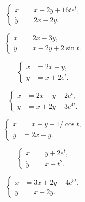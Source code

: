 \begin{multicols}{2}
	\begin{problem}
		\[ \left\{ \begin{aligned}
			\dot x &= x + 2 y + 16 t e^t, \\
			\dot y &= 2 x - 2 y.
		\end{aligned} \right. \]
	\end{problem}

	\begin{problem}
		\[ \left\{ \begin{aligned}
			\dot x &= 2 x - 3 y, \\
			\dot y &= x - 2 y + 2 \sin t.
		\end{aligned} \right. \]
	\end{problem}

	\begin{problem}
		\[ \left\{ \begin{aligned}
			\dot x &= 2 x - y, \\
			\dot y &= x + 2 e^t.
		\end{aligned} \right. \]
	\end{problem}

	\begin{problem}
		\[ \left\{ \begin{aligned}
			\dot x &= 2 x + y + 2 e^t, \\
			\dot y &= x + 2 y - 3 e^{4 t}.
		\end{aligned} \right. \]
	\end{problem}
	
	\begin{problem}
		\[ \left\{ \begin{aligned}
			\dot x &= x - y + 1 / \cos t, \\
			\dot y &= 2 x - y.
		\end{aligned} \right. \]
	\end{problem}
	
	\begin{problem}
		\[ \left\{ \begin{aligned}
			\dot x &= y + 2 e^t, \\
			\dot y &= x + t^2.
		\end{aligned} \right. \]
	\end{problem}

	\begin{problem}
		\[ \left\{ \begin{aligned}
			\dot x &= 3 x + 2 y + 4 e^{5 t}, \\
			\dot y &= x + 2 y.
		\end{aligned} \right. \]
	\end{problem}
	

\end{multicols}
